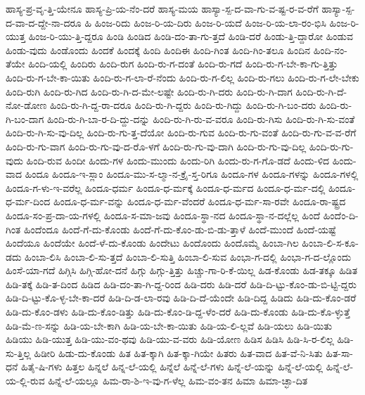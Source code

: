 {ಹಾಸ್ಯ-ಪ್ರ-ವೃ-ತ್ತಿ-ಯೇನೂ
ಹಾಸ್ಯ-ಪ್ರಿ-ಯ-ನೆಂ-ದರೆ
ಹಾಸ್ಯ-ಮಯ
ಹಾಸ್ಯಾ-ಸ್ಪ-ದ-ವಾ-ಗು-ವ-ಷ್ಟ-ರ-ವ-ರೆಗೆ
ಹಾಸ್ಯಾ-ಸ್ಪ-ದ-ವಾ-ದ-ದ್ದೇ-ನಾ-ದರೂ
ಹಿ
ಹಿಂಜ-ರಿದು
ಹಿಂಜ-ರಿ-ಯ-ದಿರು
ಹಿಂಜ-ರಿ-ಯದೆ
ಹಿಂಜ-ರಿ-ಯ-ಲಾ-ರಂ-ಭಿಸಿ
ಹಿಂಜ-ರಿ-ಯುತ್ತ
ಹಿಂಜ-ರಿ-ಯು-ತ್ತಿ-ದ್ದರೂ
ಹಿಂಡಿ
ಹಿಂಡಿದ
ಹಿಂಡಿ-ದಂ-ತಾ-ಗು-ತ್ತದೆ
ಹಿಂಡಿ-ದರೆ
ಹಿಂಡು-ತ್ತಿ-ದ್ದಾರೋ
ಹಿಂಡುವ
ಹಿಂಡು-ವುದು
ಹಿಂಡೊಂದು
ಹಿಂದಕೆ
ಹಿಂದಕ್ಕೆ
ಹಿಂದಿ
ಹಿಂದಿಈ
ಹಿಂದಿ-ಗಿಂತ
ಹಿಂದಿ-ಗಿಂ-ತಲೂ
ಹಿಂದಿನ
ಹಿಂದಿ-ನಂ-ತೆಯೇ
ಹಿಂದಿ-ಯಲ್ಲಿ
ಹಿಂದಿರು
ಹಿಂದಿ-ರುಗ
ಹಿಂದಿ-ರು-ಗ-ದಂತೆ
ಹಿಂದಿ-ರು-ಗದೆ
ಹಿಂದಿ-ರು-ಗ-ಬೇ-ಕಾ-ಗು-ತ್ತಿತ್ತು
ಹಿಂದಿ-ರು-ಗ-ಬೇ-ಕಾ-ಯಿತು
ಹಿಂದಿ-ರು-ಗ-ಲಾ-ರೆ-ನೆಂದು
ಹಿಂದಿ-ರು-ಗ-ಲಿಲ್ಲ
ಹಿಂದಿ-ರು-ಗಲು
ಹಿಂದಿ-ರು-ಗ-ಲೇ-ಬೇಕು
ಹಿಂದಿ-ರುಗಿ
ಹಿಂದಿ-ರು-ಗಿದ
ಹಿಂದಿ-ರು-ಗಿ-ದ-ಮೇ-ಲಷ್ಟೇ
ಹಿಂದಿ-ರು-ಗಿ-ದರು
ಹಿಂದಿ-ರು-ಗಿ-ದಾಗ
ಹಿಂದಿ-ರು-ಗಿ-ದೆ-ನೋ-ಡೋಣ
ಹಿಂದಿ-ರು-ಗಿ-ದ್ದ-ರಾ-ದರೂ
ಹಿಂದಿ-ರು-ಗಿ-ದ್ದರು
ಹಿಂದಿ-ರು-ಗಿದ್ದು
ಹಿಂದಿ-ರು-ಗಿ-ಬಂ-ದರು
ಹಿಂದಿ-ರು-ಗಿ-ಬಂ-ದಾಗ
ಹಿಂದಿ-ರು-ಗಿ-ಬಾ-ರ-ದಿ-ದ್ದು-ದನ್ನು
ಹಿಂದಿ-ರು-ಗಿ-ರು-ವ-ವರೂ
ಹಿಂದಿ-ರು-ಗಿಸು
ಹಿಂದಿ-ರು-ಗಿ-ಸು-ವಂತೆ
ಹಿಂದಿ-ರು-ಗಿ-ಸು-ವು-ದಿಲ್ಲ
ಹಿಂದಿ-ರು-ಗು-ತ್ತ-ದೆಯೋ
ಹಿಂದಿ-ರು-ಗುವ
ಹಿಂದಿ-ರು-ಗು-ವಂತೆ
ಹಿಂದಿ-ರು-ಗು-ವ-ವ-ರೆಗೆ
ಹಿಂದಿ-ರು-ಗು-ವಾಗ
ಹಿಂದಿ-ರು-ಗು-ವು-ದ-ರೊ-ಳಗೆ
ಹಿಂದಿ-ರು-ಗು-ವು-ದಾಗಿ
ಹಿಂದಿ-ರು-ಗು-ವು-ದಿಲ್ಲ
ಹಿಂದಿ-ರು-ಗು-ವುದು
ಹಿಂದಿ-ರುವ
ಹಿಂದೀ
ಹಿಂದು-ಗಳ
ಹಿಂದು-ಮುಂದು
ಹಿಂದು-ರಿಗಿ
ಹಿಂದು-ರು-ಗ-ಗೊ-ಡದೆ
ಹಿಂದು-ಳಿದ
ಹಿಂದು-ವಾದ
ಹಿಂದೂ
ಹಿಂದೂ-ಇ-ಸ್ಲಾಂ
ಹಿಂದೂ-ಮು-ಸ-ಲ್ಮಾ-ನ-ಕ್ರೈ-ಸ್ತ-ರಿಗೂ
ಹಿಂದೂ-ಗಳ
ಹಿಂದೂ-ಗಳನ್ನು
ಹಿಂದೂ-ಗಳಲ್ಲಿ
ಹಿಂದೂ-ಗ-ಳು-ಇ-ವರೆಲ್ಲ
ಹಿಂದೂ-ಧರ್ಮ
ಹಿಂದೂ-ಧ-ರ್ಮಕ್ಕೆ
ಹಿಂದೂ-ಧ-ರ್ಮದ
ಹಿಂದೂ-ಧ-ರ್ಮ-ದಲ್ಲಿ
ಹಿಂದೂ-ಧ-ರ್ಮ-ದಿಂದ
ಹಿಂದೂ-ಧ-ರ್ಮ-ವನ್ನು
ಹಿಂದೂ-ಧ-ರ್ಮ-ವೆಂದರೆ
ಹಿಂದೂ-ಧ-ರ್ಮ-ಸಾ-ರವೇ
ಹಿಂದೂ-ರಾ-ಷ್ಟ್ರದ
ಹಿಂದೂ-ಸಂ-ಪ್ರ-ದಾ-ಯ-ಗಳಲ್ಲಿ
ಹಿಂದೂ-ಸ-ಮಾ-ಜವು
ಹಿಂದೂ-ಸ್ಥಾ-ನದ
ಹಿಂದೂ-ಸ್ಥಾ-ನ-ದಲ್ಲೆಲ್ಲ
ಹಿಂದೆ
ಹಿಂದೆಂ-ದಿ-ಗಿಂತ
ಹಿಂದೆಂದೂ
ಹಿಂದೆ-ಗೆ-ದು-ಕೊಂಡು
ಹಿಂದೆ-ಗೆ-ದು-ಕೊಂ-ಡು-ಬಿ-ಡು-ತ್ತಾಳೆ
ಹಿಂದೆ-ಮುಂದೆ
ಹಿಂದೆ-ಯಷ್ಟೆ
ಹಿಂದೆಯೂ
ಹಿಂದೆಯೇ
ಹಿಂದೆ-ಳೆ-ದು-ಕೊಂಡು
ಹಿಂದೇಟು
ಹಿಂದೊಂದು
ಹಿಂದೊಮ್ಮೆ
ಹಿಂಬಾ-ಗಿಲ
ಹಿಂಬಾ-ಲಿ-ಸ-ಕೂ-ಡದು
ಹಿಂಬಾ-ಲಿಸಿ
ಹಿಂಬಾ-ಲಿ-ಸು-ತ್ತದೆ
ಹಿಂಬಾ-ಲಿ-ಸುತ್ತಿ
ಹಿಂಬಾ-ಲಿ-ಸುವ
ಹಿಂಭಾ-ಗ-ದಲ್ಲಿ
ಹಿಂಭಾ-ಗ-ದ-ಲ್ಲೊಂದು
ಹಿಂಸೆ-ಯಾ-ಗದೆ
ಹಿಗ್ಗಿಸಿ
ಹಿಗ್ಗಿ-ಹೋ-ದನೆ
ಹಿಗ್ಗು
ಹಿಗ್ಗು-ತ್ತಿತ್ತು
ಹಿಚ್ಚು-ಗಾ-ರಿ-ಕೆ-ಯಿಲ್ಲ
ಹಿಡ-ಕೊಂಡು
ಹಿಡ-ತಕ್ಕೂ
ಹಿಡಿತ
ಹಿಡಿ-ತಕ್ಕೆ
ಹಿಡಿ-ತ-ದಿಂದ
ಹಿಡಿದ
ಹಿಡಿ-ದಂ-ತಾ-ಗಿ-ದ್ದ-ರಿಂದ
ಹಿಡಿ-ದರು
ಹಿಡಿ-ದರೆ
ಹಿಡಿ-ದಿ-ಟ್ಟು-ಕೊಂ-ಡು-ಬಿ-ಟ್ಟಿ-ದ್ದರು
ಹಿಡಿ-ದಿ-ಟ್ಟು-ಕೊ-ಳ್ಳ-ಬೇ-ಕಾ-ದರೆ
ಹಿಡಿ-ದಿ-ಡ-ಲಾ-ರವು
ಹಿಡಿ-ದಿ-ದೆ-ಯೆಂದೇ
ಹಿಡಿ-ದಿದ್ದ
ಹಿಡಿದು
ಹಿಡಿ-ದು-ಕೊಂ-ಡರೆ
ಹಿಡಿ-ದು-ಕೊಂ-ಡಳು
ಹಿಡಿ-ದು-ಕೊಂ-ಡಿತ್ತು
ಹಿಡಿ-ದು-ಕೊಂ-ಡಿ-ದ್ದ-ಳೆಂ-ದರೆ
ಹಿಡಿ-ದು-ಕೊಂಡು
ಹಿಡಿ-ದು-ಕೊ-ಳ್ಳುತ್ತೆ
ಹಿಡಿ-ಮೆ-ಣ-ಸನ್ನು
ಹಿಡಿ-ಯ-ಬೇ-ಕಾಗಿ
ಹಿಡಿ-ಯ-ಬೇ-ಕಾ-ಯಿತು
ಹಿಡಿ-ಯ-ಲಿ-ಲ್ಲವೆ
ಹಿಡಿ-ಯಲು
ಹಿಡಿ-ಯಿತು
ಹಿಡಿಯು
ಹಿಡಿ-ಯುತ್ತ
ಹಿಡಿ-ಯು-ವಂ-ಥವು
ಹಿಡಿ-ಯು-ವ-ವರು
ಹಿಡಿ-ಯೋಣ
ಹಿಡಿಸ
ಹಿಡಿಸಿ
ಹಿಡಿ-ಸಿ-ರ-ಲಿಲ್ಲ
ಹಿಡಿ-ಸು-ತ್ತಿಲ್ಲ
ಹಿಡೀರಿ
ಹಿಡು-ದು-ಕೊಂಡು
ಹಿತ
ಹಿತ-ಕ್ಕಾಗಿ
ಹಿತ-ಕ್ಕಾ-ಗಿಯೇ
ಹಿತರು
ಹಿತ-ವಾದ
ಹಿತ-ವೆ-ನಿ-ಸಿತು
ಹಿತ-ಸಾ-ಧನೆ
ಹಿತೈ-ಷಿ-ಗಳು
ಹಿತ್ತಲ
ಹಿನ್ನಲೆ
ಹಿನ್ನ-ಲೆ-ಯಲ್ಲಿ
ಹಿನ್ನೆಲೆ
ಹಿನ್ನೆ-ಲೆ-ಗಳು
ಹಿನ್ನೆ-ಲೆ-ಯನ್ನು
ಹಿನ್ನೆ-ಲೆ-ಯಲ್ಲಿ
ಹಿನ್ನೆ-ಲೆ-ಯ-ಲ್ಲಿ-ರುವ
ಹಿನ್ನೆ-ಲೆ-ಯಲ್ಲೂ
ಹಿಮ-ರಾ-ಶಿ-ಇ-ವು-ಗ-ಳೆಲ್ಲ
ಹಿಮ-ವಂ-ತನ
ಹಿಮಾ
ಹಿಮಾ-ಚ್ಛಾ-ದಿತ
}
